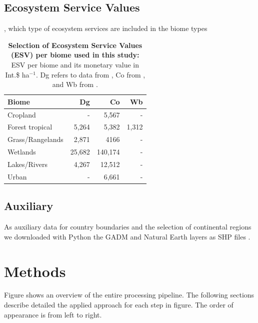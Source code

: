 	\subsection{Ecosystem Service Values}
	\label{subsec:methods_data_esv}
		,
		which type of ecosystem services are included in the biome types
		\begin{table}[ht]
			\centering
			\caption[Selection of Ecosystem Service Values (ESV) used in this study]{\textbf{Selection of Ecosystem Service Values (ESV) per biome used in this study:} ESV per biome and its monetary value in Int.\$ ha$^{-1}$. Dg refers to data from \citeauthor{Groot2012}, Co from \citeauthor{Costanza2014}, and Wb from \citeauthor{Siikamaki2015}.\citep{Groot2012,Costanza2014,Siikamaki2015}}
			\label{tab:esv_factors}
			\begin{tabular}{lrrr}
				\hline
				Biome & Dg & Co & Wb \\\hline
				Cropland & - & 5,567 & -\\
				Forest tropical & 5,264 & 5,382 & 1,312\\
				Grass/Rangelands & 2,871 & 4166 & -\\
				Wetlands & 25,682 & 140,174 & -\\
				Lakes/Rivers & 4,267 & 12,512 & -\\
				Urban & - & 6,661 & -\\\hline
			\end{tabular}
		\end{table}

	\subsection{Auxiliary}
		As auxiliary data for country boundaries and the selection of continental regions we downloaded with Python the \ac{GADM} and Natural Earth layers as \ac{SHP} files \citep{Hijmans2018,Rossum2018}.

\section{Methods}
\label{sec:methods}
	Figure  shows an overview of the entire processing pipeline. The following sections describe detailed the applied approach for each step in figure. The order of appearance is from left to right. 

